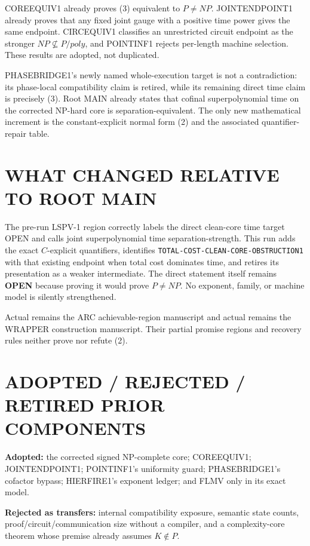 \documentclass[11pt]{article}
\newcommand{\OPEN}{\textbf{OPEN}}
\begin{document}
COREEQUIV1 already proves (3) equivalent to \(P\ne NP\).  JOINTENDPOINT1
already proves that any fixed joint gauge with a positive time power gives the
same endpoint.  CIRCEQUIV1 classifies an unrestricted circuit endpoint as the
stronger \(NP\not\subseteq P/poly\), and POINTINF1 rejects per-length machine
selection.  These results are adopted, not duplicated.

PHASEBRIDGE1's newly named whole-execution target is not a contradiction: its
phase-local compatibility claim is retired, while its remaining direct time
claim is precisely (3).  Root MAIN already states that cofinal
superpolynomial time on the corrected NP-hard core is separation-equivalent.
The only new mathematical increment is the constant-explicit normal form (2)
and the associated quantifier-repair table.

\section{WHAT CHANGED RELATIVE TO ROOT MAIN}

The pre-run LSPV-1 region correctly labels the direct clean-core time target
OPEN and calls joint superpolynomial time separation-strength.  This run adds
the exact \(C\)-explicit quantifiers, identifies
\texttt{TOTAL-COST-CLEAN-CORE-OBSTRUCTION1} with that existing endpoint when
total cost dominates time, and retires its presentation as a weaker
intermediate.  The direct statement itself remains \OPEN{} because proving it
would prove \(P\ne NP\).  No exponent, family, or machine model is silently
strengthened.

Actual  remains the ARC achievable-region manuscript and
actual  remains the WRAPPER construction manuscript.  Their
partial promise regions and recovery rules neither prove nor refute (2).

\section{ADOPTED / REJECTED / RETIRED PRIOR COMPONENTS}

\textbf{Adopted:} the corrected signed NP-complete core; COREEQUIV1;
JOINTENDPOINT1; POINTINF1's uniformity guard; PHASEBRIDGE1's cofactor bypass;
HIERFIRE1's exponent ledger; and FLMV only in its exact model.

\textbf{Rejected as transfers:} internal compatibility exposure, semantic
state counts, proof/circuit/communication size without a compiler, and a
complexity-core theorem whose premise already assumes \(K\notin P\).
\end{document}
